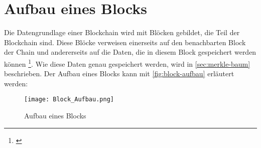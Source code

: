 




\section{Aufbau eines Blocks}\label{sec:aufbau-eines-blocks}
Die Datengrundlage einer Blockchain wird mit Blöcken gebildet, die Teil der Blockchain sind. Diese Blöcke verweisen einerseits auf den benachbarten Block der Chain und andererseits auf die Daten, die in diesem Block gespeichert werden können \footnote{\parencite[vgl.][S. 18]{Fill.2020b}}. Wie diese Daten genau gespeichert werden, wird in \vref*{sec:merkle-baum} beschrieben.
 Der Aufbau eines Blocks kann mit \vref{fig:block-aufbau} erläutert werden:

\begin{figure}[h]
    \begin{centering}
        \texttt{[image: Block\_Aufbau.png]}
        \caption[Aufbau eines Blocks]{Aufbau eines Blocks \footnotemark}
        \label{fig:block-aufbau}
    \end{centering}
\end{figure}

